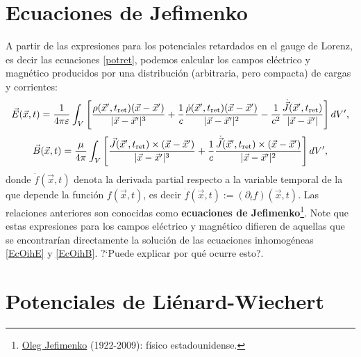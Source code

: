 \section{Ecuaciones de Jefimenko}
A partir de las expresiones para los potenciales retardados en el gauge de Lorenz, es decir las ecuaciones \eqref{potret}, podemos calcular los campos eléctrico y magnético producidos por una distribución (arbitraria, pero compacta) de cargas y corrientes:
\begin{equation}
\vec{E}(\vec{x},t)=\frac{1}{4\pi\varepsilon}\int_V \left[  \frac{\rho(\vec{x}',t_{\rm ret})(\vec{x}-\vec{x}')}{\vert \vec{x}-\vec{x}' \vert^3} + \frac{1}{c}\frac{ \dot\rho(\vec{x}',t_{\rm ret})(\vec{x}-\vec{x}')}{\vert\vec{x}-\vec{x}'\vert^2} -\frac{1}{c^2}\frac{\dot{\vec{J}} (\vec{x}',t_{\rm ret})}{\vert\vec{x}-\vec{x}' \vert} \right] dV',
\end{equation}
\begin{equation}
\vec{B}(\vec{x},t)=\frac{\mu}{4\pi} \int_V\left[
\frac{\vec{J}(\vec{x}',t_{\rm ret})\times(\vec{x}-\vec{x}')}{\vert \vec{x}-\vec{x}'\vert^3}+ \frac{1}{c}\frac{ \dot{\vec{J}}(\vec{x}',t_{\rm ret})\times(\vec{x}-\vec{x}')}{\vert\vec{x}-\vec{x}' \vert^2} \right]dV', \label{b3}
\end{equation}
donde $\dot{f}(\vec{x},t)$ denota la derivada partial respecto a la variable temporal de la que depende la función $f(\vec{x},t)$, es decir $\dot{f}(\vec{x},t):=(\partial_t f)(\vec{x},t)$. Las relaciones anteriores son conocidas como \textbf{ecuaciones de Jefimenko}\footnote{\href{http://en.wikipedia.org/wiki/Jefimenko}{Oleg Jefimenko} (1922-2009): físico estadounidense.}. Note que estas expresiones para los campos eléctrico y magnético difieren de aquellas que se encontrarían directamente la solución de las ecuaciones inhomogéneas \eqref{EcOihE} y \eqref{EcOihB}. ?`Puede explicar por qué ocurre esto?.


\section{Potenciales de Liénard-Wiechert}

